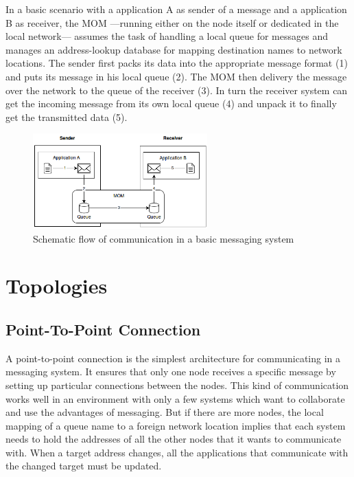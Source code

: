 In a basic scenario with a application A as sender of a message and a
application B as receiver, the MOM ---running either on the node itself or
dedicated in the local network--- assumes the task of handling a local queue for
messages and manages an address-lookup database for mapping destination names to
network locations. The sender first packs its data into the appropriate
message format (1) and puts its message in his local queue (2). The MOM then
delivery the message over the network to the queue of the receiver (3). In turn the
receiver system can get the incoming message from its own local queue (4) and
unpack it to finally get the transmitted data (5). 
\begin{figure}[H]
    \centering
    \includegraphics[width=0.6\textwidth]{images/mom-schema.png}
    \caption{Schematic flow of communication in a basic messaging system }
    \label{fig:message-oriented-middleware}
\end{figure}

\section{Topologies}
\subsection{Point-To-Point Connection}
\label{intro-messaging-pointtopoint}
A point-to-point connection is the simplest architecture for communicating in a
messaging system. It ensures that only one node receives a specific message by
setting up particular connections between the nodes. This kind of
communication works well in an environment with only a few systems which want to
collaborate and use the advantages of messaging. But if there are more
nodes, the local mapping of a queue name to a foreign network location
implies that each system needs to hold the addresses of all the other nodes that it
wants to communicate with. When a target address changes, all the applications that
communicate with the changed target must be updated. 

